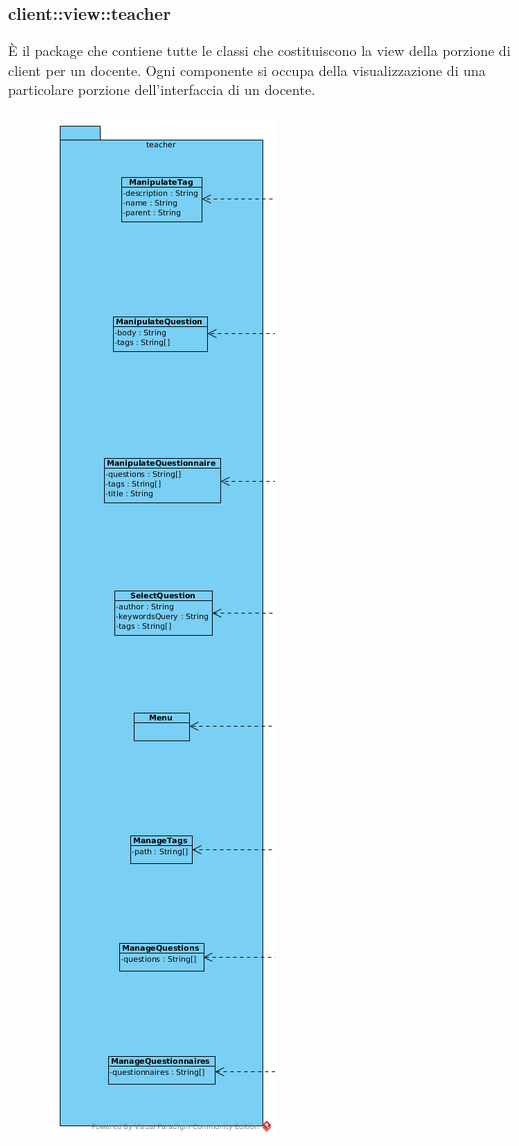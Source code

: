 \vspace{0.5cm}
\subsubsection{client::view::teacher}
È il package che contiene tutte le classi che costituiscono la view della porzione di client per un docente. Ogni componente si occupa della visualizzazione di una particolare porzione dell'interfaccia di un docente.\begin{center}
	\begin{figure}[H]
		\centering \includegraphics[scale=4, max width=\textwidth, max height=\myheight]{../img/diagrammiClassi/client/view/teacher.png}

\end{figure}
\end{center}
